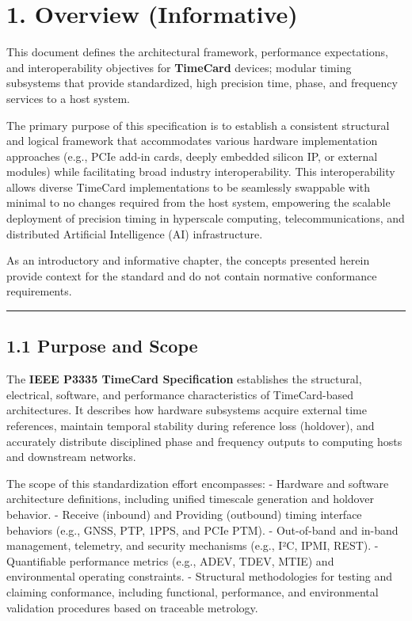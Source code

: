 \documentclass[
]{article}
\author{}
\date{}
\begin{document}
\section{1. Overview (Informative)}\label{overview-informative}

This document defines the architectural framework, performance
expectations, and interoperability objectives for \textbf{TimeCard}
devices; modular timing subsystems that provide standardized, high
precision time, phase, and frequency services to a host system.

The primary purpose of this specification is to establish a consistent
structural and logical framework that accommodates various hardware
implementation approaches (e.g., PCIe add-in cards, deeply embedded
silicon IP, or external modules) while facilitating broad industry
interoperability. This interoperability allows diverse TimeCard
implementations to be seamlessly swappable with minimal to no changes
required from the host system, empowering the scalable deployment of
precision timing in hyperscale computing, telecommunications, and
distributed Artificial Intelligence (AI) infrastructure.

As an introductory and informative chapter, the concepts presented
herein provide context for the standard and do not contain normative
conformance requirements.

\begin{center}\rule{0.5\linewidth}{0.5pt}\end{center}

\subsection{1.1 Purpose and Scope}\label{purpose-and-scope}

The \textbf{IEEE P3335 TimeCard Specification} establishes the
structural, electrical, software, and performance characteristics of
TimeCard-based architectures. It describes how hardware subsystems
acquire external time references, maintain temporal stability during
reference loss (holdover), and accurately distribute disciplined phase
and frequency outputs to computing hosts and downstream networks.

The scope of this standardization effort encompasses: - Hardware and
software architecture definitions, including unified timescale
generation and holdover behavior. - Receive (inbound) and Providing
(outbound) timing interface behaviors (e.g., GNSS, PTP, 1PPS, and PCIe
PTM). - Out-of-band and in-band management, telemetry, and security
mechanisms (e.g., I²C, IPMI, REST). - Quantifiable performance metrics
(e.g., ADEV, TDEV, MTIE) and environmental operating constraints. -
Structural methodologies for testing and claiming conformance, including
functional, performance, and environmental validation procedures based
on traceable metrology.
\end{document}
